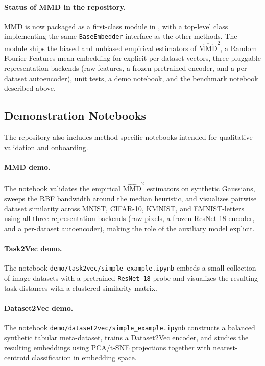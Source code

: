 \documentclass[peerreview]{IEEEtran}
\begin{document}
\paragraph{Status of MMD in the repository.}
MMD is now packaged as a first-class module in
, with a top-level
 class implementing the same
\texttt{BaseEmbedder} interface as the other methods. The module ships
the biased and unbiased empirical estimators of
$\widehat{\mathrm{MMD}}^{2}$, a Random Fourier Features mean
embedding for explicit per-dataset vectors, three pluggable
representation backends (raw features, a frozen pretrained encoder,
and a per-dataset autoencoder), unit tests, a demo notebook, and the
benchmark notebook described above.

\subsection{Demonstration Notebooks}
The repository also includes method-specific notebooks intended for
qualitative validation and onboarding.

\paragraph{MMD demo.}
The notebook  validates the
empirical $\widehat{\mathrm{MMD}}^{2}$ estimators on synthetic
Gaussians, sweeps the RBF bandwidth around the median heuristic, and
visualizes pairwise dataset similarity across MNIST, CIFAR-10, KMNIST,
and EMNIST-letters using all three representation backends (raw
pixels, a frozen ResNet-18 encoder, and a per-dataset autoencoder),
making the role of the auxiliary model explicit.

\paragraph{Task2Vec demo.}
The notebook \texttt{demo/task2vec/simple\_example.ipynb} embeds a
small collection of image datasets with a pretrained
\texttt{ResNet-18} probe and visualizes the resulting task distances
with a clustered similarity matrix.

\paragraph{Dataset2Vec demo.}
The notebook \texttt{demo/dataset2vec/simple\_example.ipynb}
constructs a balanced synthetic tabular meta-dataset, trains a
Dataset2Vec encoder, and studies the resulting embeddings using
PCA/t-SNE projections together with nearest-centroid classification in
embedding space.
\end{document}
